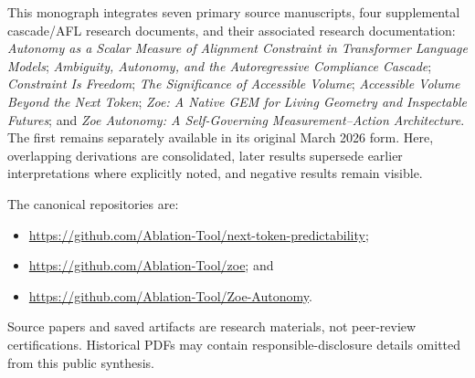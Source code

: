 \documentclass[11pt,letterpaper]{article}
\theoremstyle{definition}
\theoremstyle{plain}
\theoremstyle{remark}
\begin{document}
This monograph integrates seven primary source manuscripts, four supplemental cascade/AFL research documents, and their associated research documentation: \emph{Autonomy as a Scalar Measure of Alignment Constraint in Transformer Language Models}; \emph{Ambiguity, Autonomy, and the Autoregressive Compliance Cascade}; \emph{Constraint Is Freedom}; \emph{The Significance of Accessible Volume}; \emph{Accessible Volume Beyond the Next Token}; \emph{Zoe: A Native GEM for Living Geometry and Inspectable Futures}; and \emph{Zoe Autonomy: A Self-Governing Measurement--Action Architecture}. The first remains separately available in its original March 2026 form. Here, overlapping derivations are consolidated, later results supersede earlier interpretations where explicitly noted, and negative results remain visible.

The canonical repositories are:
\begin{itemize}
  \item \url{https://github.com/Ablation-Tool/next-token-predictability};
  \item \url{https://github.com/Ablation-Tool/zoe}; and
  \item \url{https://github.com/Ablation-Tool/Zoe-Autonomy}.
\end{itemize}
Source papers and saved artifacts are research materials, not peer-review certifications. Historical PDFs may contain responsible-disclosure details omitted from this public synthesis.

\tableofcontents
\clearpage









\appendix


\end{document}
